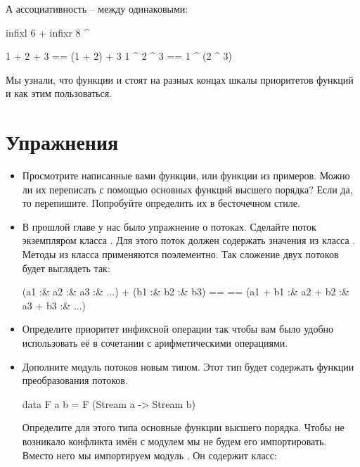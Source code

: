 А ассоциативность -- между одинаковыми:

\begin{code}
infixl 6 +
infixr 8 ^

1 + 2 + 3 == (1 + 2) + 3    
1 ^ 2 ^ 3 ==  1 ^ (2 ^ 3)  
\end{code}

Мы узнали, что функции \In{($)} и  стоят на разных
концах шкалы приоритетов функций и как этим пользоваться. 

\section{Упражнения}

\begin{itemize}

\item Просмотрите написанные вами функции, или функции
        из примеров. Можно ли их переписать с помощью
        основных функций высшего порядка? 
        Если да, то перепишите. Попробуйте определить
        их в бесточечном стиле.



\item В прошлой главе у нас было упражнение о потоках.
        Сделайте поток экземпляром класса .
        Для этого поток должен содержать значения из класса .
        Методы из класса  применяются поэлементно.
        Так сложение двух потоков будет выглядеть так:

\begin{code}
    (a1 :& a2 :& a3 :& ...) + (b1 :& b2 :& b3) ==
==  (a1 + b1 :& a2 + b2 :& a3 + b3 :& ...)
\end{code}


\item Определите приоритет инфиксной операции \In{(:&)}  
        так чтобы вам было удобно использовать её в сочетании
        с арифметическими операциями.

\item Дополните модуль потоков новым типом. Этот
      тип будет содержать функции преобразования
      потоков.

\begin{code}
data F a b = F (Stream a -> Stream b)
\end{code}

Определите для этого типа основные функции высшего порядка.
Чтобы не возникало конфликта имён с модулем 
мы не будем его импортировать. Вместо него мы импортируем
модуль . Он содержит класс:


\end{itemize}

